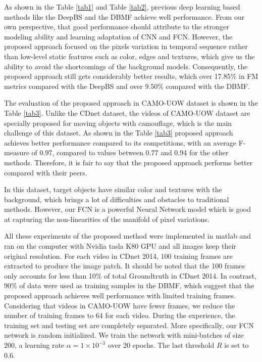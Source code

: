 \documentclass[journal]{IEEEtran}
\newcommand{\reftab}[1]{Table \ref{#1}}
\begin{document}
	As shown in the \reftab{tab1} and \reftab{tab2}, previous deep learning based methods like the DeepBS and the DBMF achieve well performance. 
From our own perspective, that good performance should attribute to the stronger modeling ability and learning adaptation of CNN and FCN. 
However, the proposed approach focused on the pixels variation in temporal sequence rather than low-level static features such as color, edges and textures, which give us the ability to avoid the shortcomings of the background models. 
Consequently, the proposed approach still gets considerably better results, which over 17.85\% in FM metrics compared with the DeepBS and over 9.50\% compared with the DBMF.

The evaluation of the proposed approach in CAMO-UOW dataset is shown in the \reftab{tab3}. 
Unlike the CDnet dataset, the videos of CAMO-UOW dataset are specially proposed for moving objects with camouflage, which is the main challenge of this dataset. 
As shown in the \reftab{tab3} proposed approach achieves better performance compared to its competitions, with an average F-measure of 0.97, compared to values between 0.77 and 0.94 for the other methods. 
Therefore, it is fair to say that the proposed approach performs better compared with their peers. 


In this dataset, target objects have similar color and textures with the background, which brings a lot of difficulties and obstacles to traditional methods. 
However, our FCN is a powerful Neural Network model which is good at capturing the non-linearities of the manifold of pixel variations. 


All these experiments of the proposed method were implemented in matlab and ran on the computer with Nvidia tasla K80 GPU and all images keep their original resolution. 
For each video in CDnet 2014, 100 training frames are extracted to produce the image patch. 
It should be noted that the 100 frames only accounts for less than 10\% of total Groundtruth in CDnet 2014. 
In contrast, 90\% of data were used as training samples in the DBMF, which suggest that the proposed approach achieves well performance with limited training frames. 
Considering that videos in CAMO-UOW have fewer frames, we reduce the number of training frames to 64 for each video. 
During the experience, the training set and testing set are completely separated. 
More specifically, our FCN network is random initialized. 
We train the network with mini-batches of size 200, a learning rate $\alpha  = 1 \times 10^{{−3}}$ over 20 epochs. 
The last threshold $R$ is set to 0.6.
\end{document}
